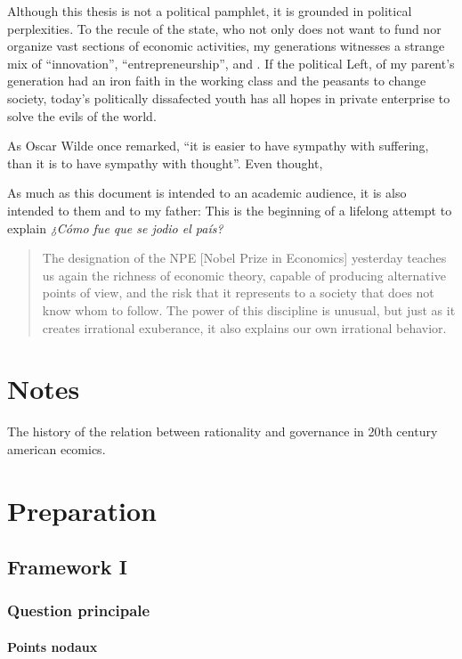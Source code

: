 \documentclass[paper=A4,portrait,twoside=true,twocolumn=false,headinclude=false,footinclude=false,fontsize=11,BCOR=15mm,DIV=calc,pagesize=auto,titlepage=firstiscover,mpinclude=true,headings=big,headings=twolinechapter,open=right,chapterprefix=false,headsepline=false,parskip=full]{scrbook}
\begin{document}
Although this thesis is not a political pamphlet, it is grounded in
political perplexities. To the recule of the state, who not only does not
want to fund nor organize vast sections of economic activities, my
generations witnesses a strange mix of ``innovation'',
``entrepreneurship'', and . If the political Left, of my parent's
generation had an iron faith in the working class and the peasants to
change society, today's politically dissafected youth has all hopes in
private enterprise to solve the evils of the world.

As Oscar Wilde once remarked, ``it is easier to have sympathy with
suffering, than it is to have sympathy with thought''. Even thought,


As much as this document is intended to an academic audience, it is also
intended to them and to my father: This is the beginning of a lifelong
attempt to explain \emph{¿Cómo fue que se jodio el país?} 

\blockcquote{Alvarez2013}{The designation of the NPE [Nobel Prize in Economics] yesterday teaches us again the richness of economic theory, capable of producing  alternative points of view, and the risk that it represents to a society that does not know whom to follow. The power of this discipline is unusual, but just as it creates irrational exuberance, it also explains our own irrational behavior.}



\lipsum

\mainmatter
\pagestyle{scrheadings}
\part{Notes}
\label{sec:org9c99d49}
The history of the relation between rationality and governance in 20th century american
ecomics. 
\part{Preparation}
\label{sec:org0a915c7}
\chapter{Framework I}
\label{sec:org3020783}
\section{Question principale}
\label{sec:org6d5db64}
\subsection{Points nodaux}
\label{sec:org59d6333}
\end{document}
